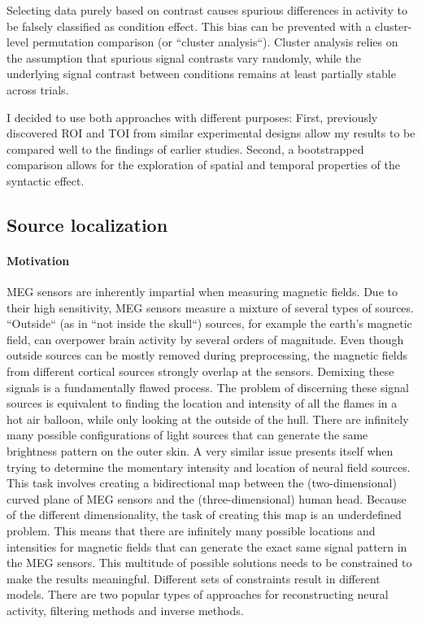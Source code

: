 Selecting data purely based on contrast causes spurious differences in activity to be falsely classified as condition effect.
This bias can be prevented with a cluster-level permutation comparison (or ``cluster analysis``).
Cluster analysis relies on the assumption that spurious signal contrasts vary randomly, while the underlying signal contrast between conditions remains at least partially stable across trials.

I decided to use both approaches with different purposes:
First, previously discovered ROI and TOI from similar experimental designs allow my results to be compared well to the findings of earlier studies.
Second, a bootstrapped comparison allows for the exploration of spatial and temporal properties of the syntactic effect.

\subsection{Source localization}

\paragraph{Motivation}
MEG sensors are inherently impartial when measuring magnetic fields.
Due to their high sensitivity, MEG sensors measure a mixture of several types of sources.
``Outside`` (as in ``not inside the skull``) sources, for example the earth's magnetic field, can overpower brain activity by several orders of magnitude.
Even though outside sources can be mostly removed during preprocessing, the magnetic fields from different cortical sources strongly overlap at the sensors.
Demixing these signals is a fundamentally flawed process.
The problem of discerning these signal sources is equivalent to finding the location and intensity of all the flames in a hot air balloon, while only looking at the outside of the hull.
There are infinitely many possible configurations of light sources that can generate the same brightness pattern on the outer skin.
A very similar issue presents itself when trying to determine the momentary intensity and location of neural field sources.
This task involves creating a bidirectional map between the (two-dimensional) curved plane of MEG sensors and the (three-dimensional) human head.
Because of the different dimensionality, the task of creating this map is an underdefined problem.
This means that there are infinitely many possible locations and intensities for magnetic fields that can generate the exact same signal pattern in the MEG sensors.
This multitude of possible solutions needs to be constrained to make the results meaningful.
Different sets of constraints result in different models.
There are two popular types of approaches for reconstructing neural activity, filtering methods and inverse methods.

